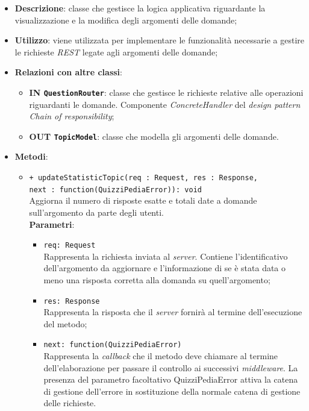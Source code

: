 \begin{itemize}
	\item \textbf{Descrizione}:
	classe che gestisce la logica applicativa riguardante la visualizzazione e la modifica degli argomenti delle domande;
	\item \textbf{Utilizzo}:
	viene utilizzata per implementare le funzionalità necessarie a gestire le richieste \textit{REST} legate agli argomenti delle domande;
	\item \textbf{Relazioni con altre classi}:
		\begin{itemize}
			\item \textbf{IN \texttt{QuestionRouter}}:
			classe che gestisce le richieste relative alle operazioni riguardanti le domande. Componente \textit{ConcreteHandler} del \textit{design pattern} \textit{Chain of responsibility};
			\item \textbf{OUT \texttt{TopicModel}}: 
			classe che modella gli argomenti delle domande.
		\end{itemize}
	\item \textbf{Metodi}:
		\begin{itemize}
			\item \texttt{+ updateStatisticTopic(req : Request, res : Response, \\next : function(QuizziPediaError)): void} \\
			Aggiorna il numero di risposte esatte e totali date a domande sull'argomento da parte degli utenti. \\
			\textbf{Parametri}:
			\begin{itemize}
			\item \texttt{req: Request} \\
			Rappresenta la richiesta inviata al \textit{server}. Contiene l'identificativo dell'argomento da aggiornare e l'informazione di se è stata data o meno una risposta corretta alla domanda su quell'argomento;
			\item \texttt{res: Response} \\
			Rappresenta la risposta che il \textit{server} fornirà al termine dell'esecuzione del metodo;
			\item \texttt{next: function(QuizziPediaError)} \\
			Rappresenta la \textit{callback} che il metodo deve chiamare al termine dell'elaborazione per passare il controllo ai successivi \textit{middleware}. La presenza del parametro facoltativo QuizziPediaError attiva la catena di gestione dell'errore in sostituzione della normale catena di gestione delle richieste.

\end{itemize}
\end{itemize}
\end{itemize}
